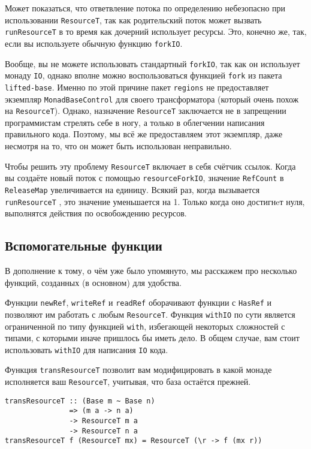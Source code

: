 Может показаться, что ответвление потока по определению небезопасно при использовании
\lstinline'ResourceT', так как родительский поток может вызвать
\lstinline'runResourceT' в то время
как дочерний использует ресурсы. Это, конечно же, так, если вы используете обычную
функцию \lstinline'forkIO'.

\begin{remark}
Вообще, вы не можете использовать стандартный \lstinline'forkIO', так как он
использует монаду
\lstinline{IO}, однако вполне можно воспользоваться функцией \lstinline'fork' из пакета \lstinline{lifted-base}.
Именно по этой причине пакет \lstinline{regions} не предоставляет экземпляр \lstinline'MonadBaseControl' для своего
трансформатора (который очень похож на \lstinline'ResourceT'). Однако, назначение
\lstinline'ResourceT' заключается не в запрещении
программистам стрелять себе в ногу, а только в облегчении написания
правильного кода. Поэтому, мы всё же предоставляем этот экземпляр, даже несмотря на то, что он может быть
использован неправильно.
\end{remark}

Чтобы решить эту проблему \lstinline'ResourceT' включает в себя
счётчик ссылок. Когда вы создаёте новый поток с помощью \lstinline'resourceForkIO',
значение \lstinline'RefCount' в \lstinline'ReleaseMap' увеличивается на единицу. Всякий раз, когда вызывается
\lstinline'runResourceT'
, это значение уменьшается на 1. Только когда оно достигнeт нуля, выполнятся
действия по освобождению ресурсов.

\subsection{Вспомогательные функции}

В дополнение к тому, о чём уже было упомянуто, мы расскажем про несколько функций, созданных (в основном) для удобства.

Функции \lstinline!newRef!, \lstinline!writeRef! и \lstinline!readRef! оборачивают
функции с \lstinline'HasRef' и позволяют им работать с любым \lstinline'ResourceT'.
Функция \lstinline!withIO! по сути является ограниченной по типу функцией \lstinline!with!, избегающей некоторых сложностей с типами, с которыми иначе пришлось бы иметь дело.
В общем случае, вам стоит использовать \lstinline'withIO' для написания \lstinline{IO} кода.

Функция \lstinline!transResourceT! позволит вам модифицировать в какой монаде исполняется ваш
\lstinline!ResourceT!, учитывая, что база остаётся прежней.
\begin{lstlisting}
transResourceT :: (Base m ~ Base n)
               => (m a -> n a)
               -> ResourceT m a
               -> ResourceT n a
transResourceT f (ResourceT mx) = ResourceT (\r -> f (mx r))
\end{lstlisting}

